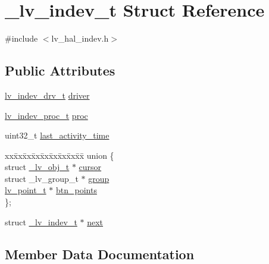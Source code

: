 \hypertarget{struct__lv__indev__t}{}\section{\+\_\+lv\+\_\+indev\+\_\+t Struct Reference}
\label{struct__lv__indev__t}


{\ttfamily \#include $<$lv\+\_\+hal\+\_\+indev.\+h$>$}

\subsection*{Public Attributes}
\begin{DoxyCompactItemize}
\item 
\mbox{\hyperlink{structlv__indev__drv__t}{lv\+\_\+indev\+\_\+drv\+\_\+t}} \mbox{\hyperlink{struct__lv__indev__t_a2c63dfa5487ece6410c8a72c8651ff9f}{driver}}
\item 
\mbox{\hyperlink{lv__hal__indev_8h_a879d56a3b2755d01640a0404c9382a2d}{lv\+\_\+indev\+\_\+proc\+\_\+t}} \mbox{\hyperlink{struct__lv__indev__t_a3223b37d15de61de4d0be84d22b7900e}{proc}}
\item 
uint32\+\_\+t \mbox{\hyperlink{struct__lv__indev__t_a1ae81aed5ba30e123067b99467d9d9aa}{last\+\_\+activity\+\_\+time}}
\item 
\begin{tabbing}
xx\=xx\=xx\=xx\=xx\=xx\=xx\=xx\=xx\=\kill
union \{\\
\>struct \mbox{\hyperlink{struct__lv__obj__t}{\_lv\_obj\_t}} $\ast$ \mbox{\hyperlink{struct__lv__indev__t_afca94f9275c3ca669979477d56fd884d}{cursor}}\\
\>struct \_lv\_group\_t $\ast$ \mbox{\hyperlink{struct__lv__indev__t_abe81eefe10ba7f66ff9ffe3a48db3a31}{group}}\\
\>\mbox{\hyperlink{structlv__point__t}{lv\_point\_t}} $\ast$ \mbox{\hyperlink{struct__lv__indev__t_a336b76ec1054a3004a33d156c6582b24}{btn\_points}}\\
\}; \\

\end{tabbing}\item 
struct \mbox{\hyperlink{struct__lv__indev__t}{\+\_\+lv\+\_\+indev\+\_\+t}} $\ast$ \mbox{\hyperlink{struct__lv__indev__t_a79b395b9d7d45b376a14b2e0be430ff0}{next}}
\end{DoxyCompactItemize}


\subsection{Member Data Documentation}
\mbox{\label{struct__lv__indev__t_a21b6daad8414d249867b381d9b16d790}} 
